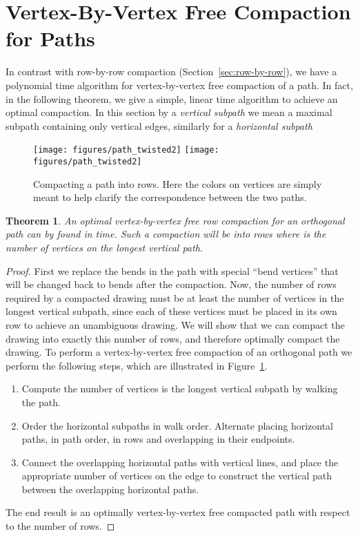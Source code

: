 \documentclass[12pt]{article}
\newtheorem{theorem}{Theorem}
\theoremstyle{definitions}
\begin{document}
\section{Vertex-By-Vertex Free Compaction for Paths}
In contrast with row-by-row compaction (Section~\ref{sec:row-by-row}), we have a polynomial time algorithm for
vertex-by-vertex free compaction of a path. In fact, in the following theorem,
we give a simple, linear time algorithm to achieve an optimal compaction. In this section by a \emph{vertical subpath} we mean a maximal subpath containing only vertical edges, similarly for a \emph{horizontal subpath}

\begin{figure}[ht]
\centering
\ifFull
\texttt{[image: figures/path\_twisted2]}
\else
\texttt{[image: figures/path\_twisted2]}
\fi
\caption{Compacting a path into  rows. 
Here the colors on vertices are simply meant to help
clarify the correspondence between the two paths.}
\label{fig:path-untwist}
\end{figure}

\begin{theorem}
An optimal vertex-by-vertex free row compaction for an orthogonal path can by found in  time. Such a compaction will be into  rows where  is the number of vertices on the longest vertical path.
\end{theorem}
\newpage
\begin{proof}
First we replace the bends in the path with special ``bend vertices'' that will be changed back to bends after the compaction.
Now, the number of rows required by a compacted drawing must be at least
the number of vertices in the longest vertical subpath, since each of these
vertices must be placed in its own row to achieve an unambiguous drawing. We
will show that we can compact the drawing into exactly this number of rows, and therefore optimally compact the drawing.
To perform a vertex-by-vertex free compaction of an orthogonal path we perform the
following steps, which are illustrated in Figure~\ref{fig:path-untwist}.
\begin{enumerate}
\item
Compute the number  of vertices is the longest vertical subpath by walking the path.
\item
Order the horizontal subpaths in walk order. Alternate placing horizontal paths, in path order, in rows  and  overlapping in their endpoints.
\item
Connect the overlapping horizontal paths with vertical lines, and place the appropriate   number of vertices on the edge to construct the vertical path between the overlapping horizontal paths.
\end{enumerate}
The end result is an optimally vertex-by-vertex free compacted path with respect to the number of rows.
\end{proof}
\end{document}
